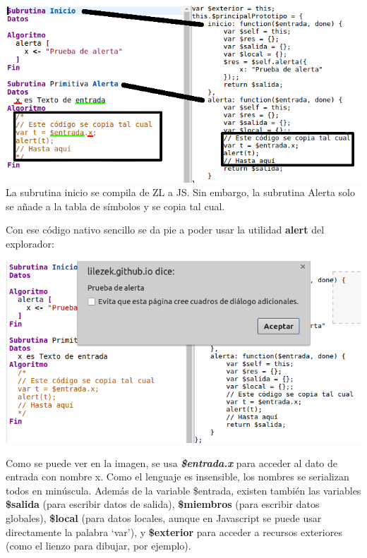 \documentclass{report}
\begin{document}
	\begin{center}
	\includegraphics[width=1\linewidth]{zlyjs}
	La subrutina inicio se compila de ZL a JS. Sin embargo, la subrutina Alerta solo se añade a la tabla de símbolos y se copia tal cual.
	\end{center}
	
	Con ese código nativo sencillo se da pie a poder usar la utilidad \textbf{alert} del explorador:
	
	\begin{center}
	\includegraphics[width=1\linewidth]{alert}
	\end{center}
	
	\vspace{10px}
	
	Como se puede ver en la imagen, se usa \textbf{\textit{\$entrada.x}} para acceder al dato de entrada con nombre x. Como el lenguaje es insensible, los nombres se serializan todos en minúscula. Además de la variable \$entrada, existen también las variables \textbf{\$salida} (para escribir datos de salida), \textbf{\$miembros} (para escribir datos globales), \textbf{\$local} (para datos locales, aunque en Javascript se puede usar directamente la palabra `var'), y \textbf{\$exterior} para acceder a recursos exteriores (como el lienzo para dibujar, por ejemplo). 
	
\end{document}
